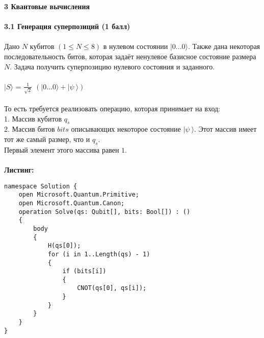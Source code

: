 \documentclass{article}
\begin{document}
\textbf{\Large 3 Квантовые вычисления}\\\\
\hfill \break
\textbf{\Large 3.1 Генерация суперпозиций (1 балл)}\\\\
\hfill \break
Дано \(N\) кубитов \((1 \leq N \leq 8)\) в нулевом состоянии \(|0...0\rangle\). Также дана некоторая последовательность битов, которая задаёт ненулевое базисное состояние размера \(N\). Задача получить суперпозицию нулевого состояния и заданного.\\\\
\(|S\rangle\) = \(\frac{1}{\sqrt{2}}\) \((|0 ... 0\rangle + |\psi\ \rangle)\)\\\\
То есть требуется реализовать операцию, которая принимает на вход:\\
1. Массив кубитов \(q_s\)\\
2. Массив битов \(bits \) описывающих некоторое состояние \(|\psi\ \rangle\). Этот массив имеет тот же самый размер, что и \(q_s\).\\ 
Первый элемент этого массива равен \(1\).\\\\
\textbf{Листинг:}\\
\begin{lstlisting}
namespace Solution {
    open Microsoft.Quantum.Primitive;
    open Microsoft.Quantum.Canon;
    operation Solve(qs: Qubit[], bits: Bool[]) : () 
    {
        body 
        { 
            H(qs[0]);
            for (i in 1..Length(qs) - 1) 
			{
                if (bits[i]) 
				{
                    CNOT(qs[0], qs[i]); 
                } 
            }                  
        }
    }
}
\end{lstlisting}
\end{document}
